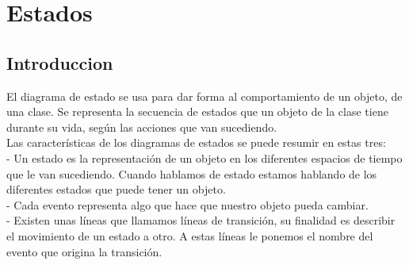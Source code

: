 \chapter{Estados}
\section{Introduccion}
\begin{flushleft}
	
El diagrama de estado se usa para dar forma al comportamiento de un objeto, de una clase. Se representa la secuencia de estados que un objeto de la clase tiene durante su vida, según las acciones que van sucediendo.
\\
Las características de los diagramas de estados se puede resumir en estas tres:\\
 - Un estado es la representación de un objeto en los diferentes espacios de tiempo que le van sucediendo. Cuando hablamos de estado estamos hablando de los diferentes estados que puede tener un objeto.\\
 - Cada evento representa algo que hace que nuestro objeto pueda cambiar.\\
 - Existen unas líneas que llamamos líneas de transición, su finalidad es describir el movimiento de un estado a otro. A estas líneas le ponemos el nombre del evento que origina la transición.
\end{flushleft}
\newpage
